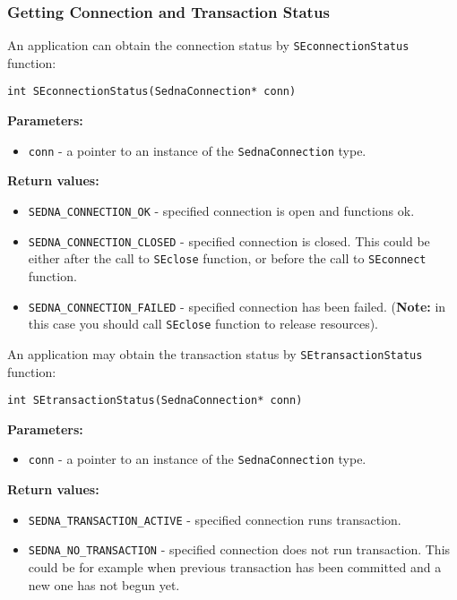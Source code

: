 \documentclass[a4paper,12pt]{article}
\newenvironment{citemize}
{\begin{itemize}
  \setlength{\itemsep}{0pt}
  \setlength{\parskip}{0pt}
  \setlength{\parsep}{0pt}}
{\end{itemize}}
\begin{document}
\subsubsection{Getting Connection and Transaction Status}

An application can obtain the connection status by \verb!SEconnectionStatus!
function:

\begin{verbatim}
int SEconnectionStatus(SednaConnection* conn)
\end{verbatim}

\noindent
\textbf{Parameters:}

\begin{citemize}
\item\verb!conn! - a pointer to an instance of the \verb!SednaConnection! type.
\end{citemize}

\noindent
\textbf{Return values:}

\medskip

\begin{citemize}
\item\verb!SEDNA_CONNECTION_OK! - specified connection is open and functions ok.
\item\verb!SEDNA_CONNECTION_CLOSED! - specified connection is closed. This could
be either after the call to \verb!SEclose! function, or before the call to
\verb!SEconnect! function.
\item\verb!SEDNA_CONNECTION_FAILED! - specified connection has been failed.
(\textbf{Note:} in this case you should call \verb!SEclose! function to release
resources).
\end{citemize}

An application may obtain the transaction status by \verb!SEtransactionStatus!
function:

\begin{verbatim}
int SEtransactionStatus(SednaConnection* conn)
\end{verbatim}

\noindent
\textbf{Parameters:}

\begin{citemize}
\item\verb!conn! - a pointer to an instance of the \verb!SednaConnection! type.
\end{citemize}

\noindent
\textbf{Return values:}

\begin{citemize}
\item\verb!SEDNA_TRANSACTION_ACTIVE! - specified connection runs transaction.
\item\verb!SEDNA_NO_TRANSACTION! - specified connection does not run
transaction. This could be for example when previous transaction has been
committed and a new one has not begun yet.
\end{citemize}
\end{document}
